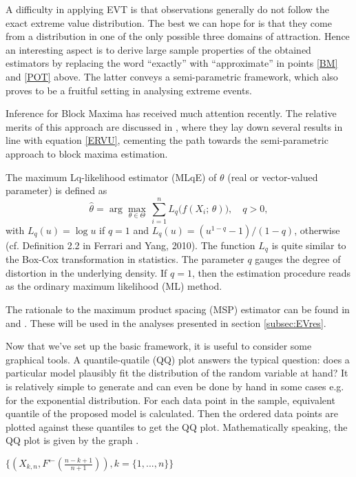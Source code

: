 \documentclass[a4paper]{article}
\newcommand{\sumab}[2]{\ensuremath{\sum\limits_{#1}^{#2}}}
\newcommand{\argmax}[1]{\ensuremath{\displaystyle {\arg\max_{#1}}}}
\begin{document}
A difficulty in applying EVT is that observations generally do not follow the exact extreme value distribution. The best we can hope for is that they come from a distribution in one of the only possible three domains of attraction. Hence an interesting aspect is to derive large sample properties of the obtained estimators by replacing the word ``exactly'' with ``approximate'' in points \ref{BM} and \ref{POT} above. The latter conveys a semi-parametric framework, which also proves to be a  fruitful setting in analysing extreme events. 

Inference for Block Maxima has received much attention recently. The relative merits of this approach are discussed in \cite{FdeH:15}, where they lay down several results in line with equation \ref{ERVU}, cementing the path towards the semi-parametric approach to block maxima estimation.

The maximum Lq-likelihood estimator (MLqE) of $\theta$ (real or vector-valued parameter) is defined as
\begin{equation*}
	\hat{\theta}= \argmax{\theta \in \Theta} \, \sumab{i=1}{n} L_q\bigl( f(X_i; \, \theta)\bigr), \quad q>0,
\end{equation*}
with $L_q(u)= \log u$ if $q=1$ and $L_q(u)= (u^{1-q}- 1)/(1-q)$, otherwise (cf. Definition 2.2 in Ferrari and Yang, 2010). The function $L_q$ is quite similar to the Box-Cox transformation in statistics. The parameter $q$ gauges the degree of distortion in the underlying density. If $q=1$, then the estimation procedure reads as the ordinary maximum likelihood (ML) method.

The rationale to the maximum product spacing (MSP) estimator can be found in \cite{ChengAmin:79} and \cite{Ranneby:84}. These will be used in the analyses presented in section \ref{subsec:EVres}.

Now that we've set up the basic framework, it is useful to consider some graphical tools. A quantile-quatile (QQ) plot answers the typical question: does a particular model plausibly fit the distribution of the random variable at hand? It is relatively simple to generate and can even be done by hand in some cases e.g. for the exponential distribution. For each data point in the sample, equivalent quantile of the proposed model is calculated. Then the ordered data points are plotted against these quantiles to get the QQ plot. Mathematically speaking, the QQ plot is given by the graph \cite[ch.~6]{embrechts}. \newline

\centerline{$\{(X_{k,n},F^{\leftarrow}(\frac{n-k+1}{n+1})), k = \{1,...,n\}\}$}
\end{document}
